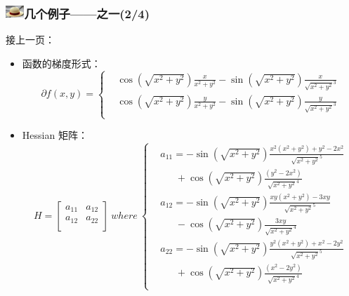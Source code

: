 \documentclass{beamer}
\begin{document}
\begin{frame}\frametitle{\includegraphics[width=7mm,height=5mm]{Images/strawhat.jpg}几个例子——之一(2/4)}
{\tiny
接上一页：
\begin{itemize}
\item 函数的梯度形式：
\begin{displaymath}
\partial f(x,y)=\left\{
\begin{split}
&\cos(\sqrt{x^2+y^2})\frac{x}{x^2+y^2}-\sin(\sqrt{x^2+y^2})\frac{x}{\sqrt{x^2+y^2}^3}\\
&\cos(\sqrt{x^2+y^2})\frac{y}{x^2+y^2}-\sin(\sqrt{x^2+y^2})\frac{y}{\sqrt{x^2+y^2}^3}\\
\end{split}
\right.
\end{displaymath}
\item Hessian 矩阵：
\begin{displaymath}
H=\left[
\begin{array}{cc}
a_{11}&a_{12}\\
a_{12}&a_{22}\\
\end{array}
\right]~where~
\left\{
\begin{split}
&a_{11}=-\sin(\sqrt{x^2+y^2})\frac{x^2(x^2+y^2)+y^2-2x^2}{\sqrt{x^2+y^2}^5}\\
&~~~~~~~+\cos(\sqrt{x^2+y^2})\frac{(y^2-2x^2)}{\sqrt{x^2+y^2}^4}\\
&a_{12}=-\sin(\sqrt{x^2+y^2})\frac{xy(x^2+y^2)-3xy}{\sqrt{x^2+y^2}^5}\\
&~~~~~~~-\cos(\sqrt{x^2+y^2})\frac{3xy}{\sqrt{x^2+y^2}^4}\\
&a_{22}=-\sin(\sqrt{x^2+y^2})\frac{y^2(x^2+y^2)+x^2-2y^2}{\sqrt{x^2+y^2}^5}\\
&~~~~~~~+\cos(\sqrt{x^2+y^2})\frac{(x^2-2y^2)}{\sqrt{x^2+y^2}^4}\\
\end{split}
\right.
\end{displaymath}
\end{itemize}
}
\end{frame}
\end{document}

